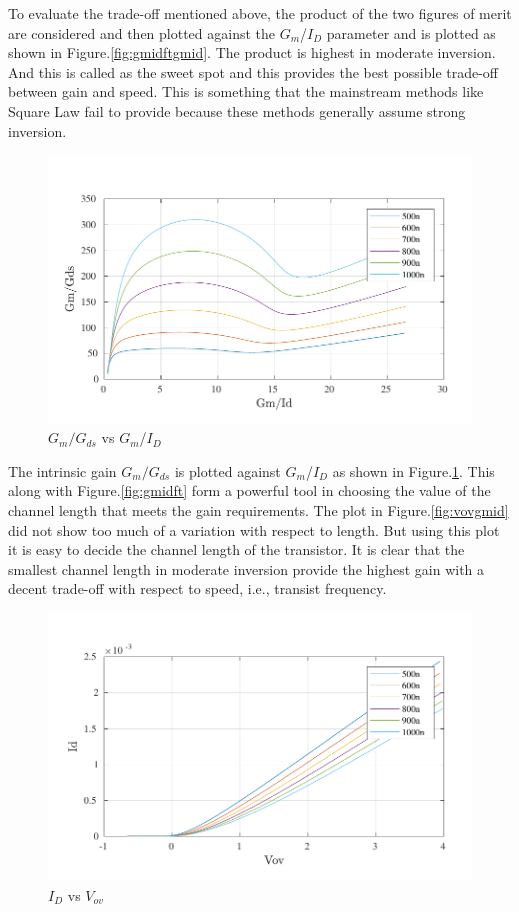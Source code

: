 To evaluate the trade-off mentioned above, the product of the two figures of merit are considered and then plotted against the $G_m$/$I_D$ parameter and is plotted as shown in Figure.\ref{fig:gmidftgmid}. The product is highest in moderate inversion. And this is called as the sweet spot and this provides the best possible trade-off between gain and speed. This is something that the mainstream methods like Square Law fail to provide because these methods generally assume strong inversion.

\begin{figure} [H]
\centering
\includegraphics[scale=1]{Figures/Misc/PDFs/nmos_len_gmidgmgds.pdf}
\caption{$G_m/G_{ds}$ vs $G_m$/$I_D$}
\label{fig:gmidgmgds}
\end{figure}

The intrinsic gain $G_m/G_{ds}$ is plotted against $G_m$/$I_D$ as shown in Figure.\ref{fig:gmidgmgds}. This along with Figure.\ref{fig:gmidft} form a powerful tool in choosing the value of the channel length that meets the gain requirements. The plot in Figure.\ref{fig:vovgmid} did not show too much of a variation with respect to length. But using this plot it is easy to decide the channel length of the transistor. It is clear that the smallest channel length in moderate inversion provide the highest gain with a decent trade-off with respect to speed, i.e., transist frequency.

\begin{figure} [H]
\centering
\includegraphics[scale=1]{Figures/Misc/PDFs/nmos_len_vovid.pdf}
\caption{$I_D$ vs $V_{ov}$}
\label{fig:vovid}
\end{figure}

